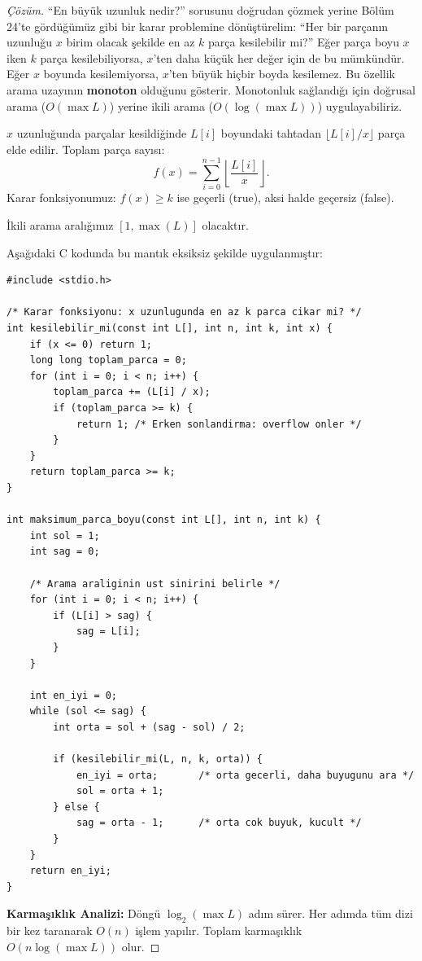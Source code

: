 \begin{proof}[Çözüm]
``En büyük uzunluk nedir?'' sorusunu doğrudan çözmek yerine Bölüm 24'te gördüğümüz gibi bir karar problemine dönüştürelim: ``Her bir parçanın uzunluğu $x$ birim olacak şekilde en az $k$ parça kesilebilir mi?''
Eğer parça boyu $x$ iken $k$ parça kesilebiliyorsa, $x$'ten daha küçük her değer için de bu mümkündür. Eğer $x$ boyunda kesilemiyorsa, $x$'ten büyük hiçbir boyda kesilemez. Bu özellik arama uzayının \textbf{monoton} olduğunu gösterir. Monotonluk sağlandığı için doğrusal arama ($O(\max L)$) yerine ikili arama ($O(\log(\max L))$) uygulayabiliriz.

$x$ uzunluğunda parçalar kesildiğinde $L[i]$ boyundaki tahtadan $\lfloor L[i] / x \rfloor$ parça elde edilir. Toplam parça sayısı:
\[
f(x) = \sum_{i=0}^{n-1} \left\lfloor \frac{L[i]}{x} \right\rfloor.
\]
Karar fonksiyonumuz: $f(x) \ge k$ ise geçerli (true), aksi halde geçersiz (false).

İkili arama aralığımız $[1, \max(L)]$ olacaktır.

Aşağıdaki C kodunda bu mantık eksiksiz şekilde uygulanmıştır:

\begin{lstlisting}[language=CTemel]
#include <stdio.h>

/* Karar fonksiyonu: x uzunlugunda en az k parca cikar mi? */
int kesilebilir_mi(const int L[], int n, int k, int x) {
    if (x <= 0) return 1;
    long long toplam_parca = 0;
    for (int i = 0; i < n; i++) {
        toplam_parca += (L[i] / x);
        if (toplam_parca >= k) {
            return 1; /* Erken sonlandirma: overflow onler */
        }
    }
    return toplam_parca >= k;
}

int maksimum_parca_boyu(const int L[], int n, int k) {
    int sol = 1;
    int sag = 0;
    
    /* Arama araliginin ust sinirini belirle */
    for (int i = 0; i < n; i++) {
        if (L[i] > sag) {
            sag = L[i];
        }
    }
    
    int en_iyi = 0;
    while (sol <= sag) {
        int orta = sol + (sag - sol) / 2;
        
        if (kesilebilir_mi(L, n, k, orta)) {
            en_iyi = orta;       /* orta gecerli, daha buyugunu ara */
            sol = orta + 1;
        } else {
            sag = orta - 1;      /* orta cok buyuk, kucult */
        }
    }
    return en_iyi;
}
\end{lstlisting}

\textbf{Karmaşıklık Analizi:}
Döngü $\log_2(\max L)$ adım sürer. Her adımda tüm dizi bir kez taranarak $O(n)$ işlem yapılır. Toplam karmaşıklık $O(n \log(\max L))$ olur.
\end{proof}

